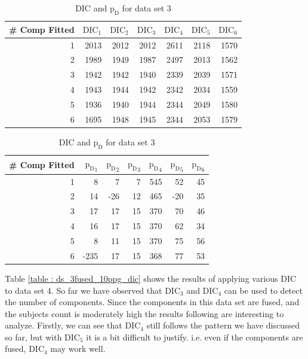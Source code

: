 \begin{table}[!htb]
\centering
\caption{DIC and $\text{p}_\text{D}$ for data set 3}
\label{table : ds_3wellsep_3ppg_dic}
\begin{tabular}{@{}rrrrrrr@{}}
\toprule
\# Comp Fitted & $\text{DIC}_1$ & $\text{DIC}_2$  & $\text{DIC}_3$  & $\text{DIC}_4$  & $\text{DIC}_5$  & $\text{DIC}_6$  \\ \midrule
1 & 2013 & 2012 & 2012 & 2611 & 2118 & 1570 \\
2 & 1989 & 1949 & 1987 & 2497 & 2013 & 1562 \\
3 & 1942 & 1942 & 1940 & 2339 & 2039 & 1571 \\
4 & 1943 & 1944 & 1942 & 2342 & 2034 & 1559 \\
5 & 1936 & 1940 & 1944 & 2344 & 2049 & 1580 \\
6 & 1695 & 1948 & 1945 & 2344 & 2053 & 1579 \\ \bottomrule
\end{tabular}

\begin{tabular}{@{}rrrrrrr@{}}
\toprule
\# Comp Fitted & ${\text{p}_\text{D}}_1$ & ${\text{p}_\text{D}}_2$ & ${\text{p}_\text{D}}_3$ & ${\text{p}_\text{D}}_4$ & ${\text{p}_\text{D}}_5$ & ${\text{p}_\text{D}}_6$ \\ \midrule
1 & 8 & 7 & 7 & 545 & 52 & 45 \\
2 & 14 & -26 & 12 & 465 & -20 & 35 \\
3 & 17 & 17 & 15 & 370 & 70 & 46 \\
4 & 16 & 17 & 15 & 370 & 62 & 34 \\
5 & 8 & 11 & 15 & 370 & 75 & 56 \\
6 & -235 & 17 & 15 & 368 & 77 & 53 \\ \bottomrule
\end{tabular}
\end{table}

Table \ref{table : ds_3fused_10ppg_dic} shows the results of applying various DIC to data set 4. So far we have observed that $\text{DIC}_3$ and $\text{DIC}_4$ can be used to detect the number of components. Since the components in this data set are fused, and the subjects count is moderately high the results following are interesting to analyze. Firstly, we can see that $\text{DIC}_4$ still follows the pattern we have discussed so far, but with $\text{DIC}_5$ it is a bit difficult to justify. i.e. even if the components are fused, $\text{DIC}_4$ may work well.\\
 
